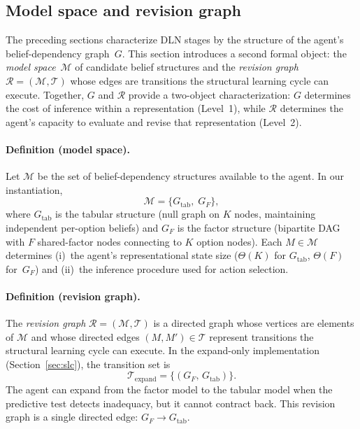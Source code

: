 
\subsection{Model space and revision graph}\label{sec:model_space}

The preceding sections characterize DLN stages by the structure of the agent's
belief-dependency graph~$G$.  This section introduces a second formal object:
the \emph{model space}~$\mathcal{M}$ of candidate belief structures and the
\emph{revision graph} $\mathcal{R}=(\mathcal{M},\mathcal{T})$ whose edges are
transitions the structural learning cycle can execute.  Together, $G$ and
$\mathcal{R}$ provide a two-object characterization: $G$ determines the cost of
inference within a representation (Level~1), while $\mathcal{R}$ determines the
agent's capacity to evaluate and revise that representation (Level~2).

\paragraph{Definition (model space).}
Let $\mathcal{M}$ be the set of belief-dependency structures available to the
agent.  In our instantiation,
\[
\mathcal{M} = \bigl\{G_{\mathrm{tab}},\; G_{F}\bigr\},
\]
where $G_{\mathrm{tab}}$ is the tabular structure (null graph on $K$ nodes,
maintaining independent per-option beliefs) and $G_F$ is the factor structure
(bipartite DAG with $F$ shared-factor nodes connecting to $K$ option nodes).
Each $M \in \mathcal{M}$ determines (i)~the agent's representational state size
($\Theta(K)$ for $G_{\mathrm{tab}}$, $\Theta(F)$ for~$G_F$) and (ii)~the
inference procedure used for action selection.

\paragraph{Definition (revision graph).}
The \emph{revision graph} $\mathcal{R} = (\mathcal{M}, \mathcal{T})$ is a
directed graph whose vertices are elements of $\mathcal{M}$ and whose directed
edges $(M, M') \in \mathcal{T}$ represent transitions the structural learning
cycle can execute.
In the expand-only implementation (Section~\ref{sec:slc}), the transition set is
\[
\mathcal{T}_{\text{expand}} = \bigl\{(G_F,\, G_{\mathrm{tab}})\bigr\}.
\]
The agent can expand from the factor model to the tabular model when the
predictive test detects inadequacy, but it cannot contract back.  This revision
graph is a single directed edge: $G_F \to G_{\mathrm{tab}}$.

